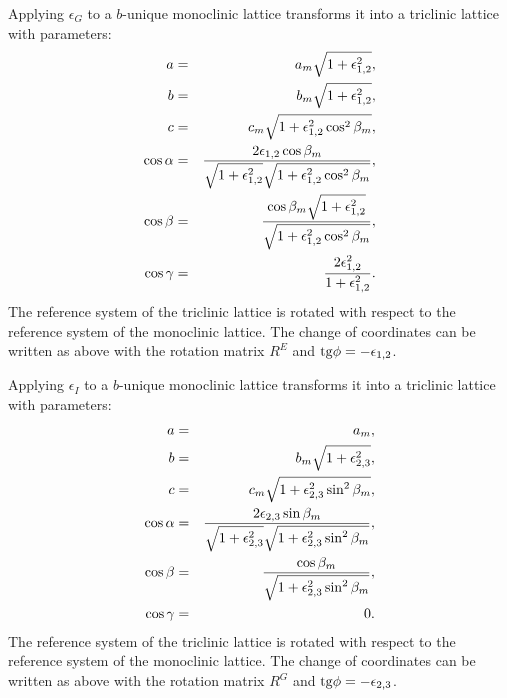 \documentclass[12pt,a4paper]{article}
\begin{document}
Applying $\epsilon_G$ to a $b$-unique monoclinic lattice transforms
it into a triclinic lattice with parameters:
\begin{eqnarray}
a&=&a_m \sqrt{1+\epsilon_{1,2}^2}, \\
b&=&b_m \sqrt{1+\epsilon_{1,2}^2}, \\
c&=&c_m \sqrt{1+\epsilon_{1,2}^2 \cos^2\beta_m}, \\
\cos\alpha &=& {2 \epsilon_{1,2} \cos\beta_m \over 
\sqrt{1+\epsilon_{1,2}^2} \sqrt{1+\epsilon_{1,2}^2 \cos^2\beta_m}}, \\
\cos\beta &=& {\cos\beta_m \sqrt{1+\epsilon_{1,2}^2} \over
\sqrt{1+\epsilon_{1,2}^2 \cos^2\beta_m}}, \\
\cos\gamma &=& {2 \epsilon_{1,2}^2 \over 1+\epsilon_{1,2}^2}.
\end{eqnarray}
The reference system of the triclinic lattice is rotated 
with respect to the reference system of the  
monoclinic lattice. 
The change of coordinates can be written as above with the rotation matrix 
$R^E$ and ${\rm tg}\phi=-\epsilon_{1,2}$.

Applying $\epsilon_I$ to a $b$-unique monoclinic lattice transforms
it into a triclinic lattice with parameters:
\begin{eqnarray}
a&=&a_m,  \\
b&=&b_m \sqrt{1+\epsilon_{2,3}^2}, \\
c&=&c_m \sqrt{1+\epsilon_{2,3}^2 \sin^2\beta_m}, \\
\cos\alpha &=& {2 \epsilon_{2,3} \sin\beta_m \over 
\sqrt{1+\epsilon_{2,3}^2} \sqrt{1+\epsilon_{2,3}^2 \sin^2\beta_m}}, \\
\cos\beta &=& { \cos\beta_m  \over
\sqrt{1+\epsilon_{2,3}^2 \sin^2\beta_m}}, \\
\cos\gamma &=& 0. 
\end{eqnarray}
The reference system of the triclinic lattice is rotated 
with respect to the reference system of the  
monoclinic lattice.
The change of coordinates can be written as above with the rotation matrix 
$R^G$ and ${\rm tg}\phi=-\epsilon_{2,3}$.
\end{document}
